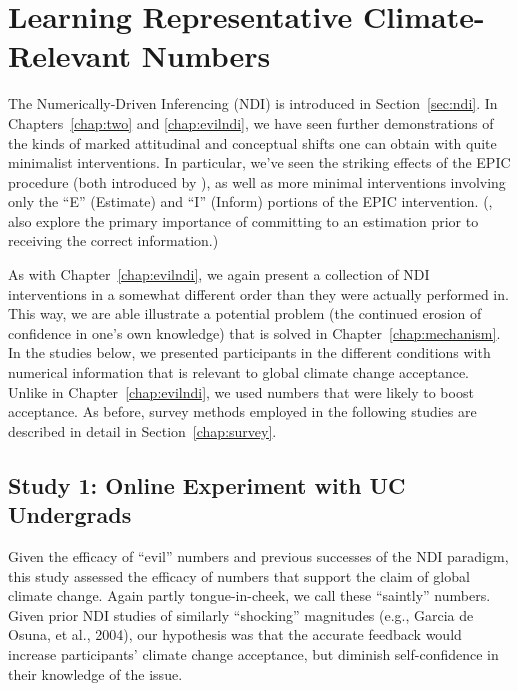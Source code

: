 \graphicspath{{pro-ndi/}}

\chapter{Learning Representative Climate-Relevant Numbers}
\label{chap:prondi}

The Numerically-Driven Inferencing (NDI) is introduced in Section~\ref{sec:ndi}.
In Chapters~\ref{chap:two} and \ref{chap:evilndi}, we have seen further
demonstrations of the kinds of marked attitudinal and conceptual shifts one can
obtain with quite minimalist interventions. In particular, we've seen the
striking effects of the EPIC procedure (both introduced by
\cite{ranney_numerically_2001_fixed}), as well as more minimal
interventions involving only the “E” (Estimate) and “I” (Inform) portions of the
EPIC intervention. (\cite{rinne_estimation_2006}, also explore the primary
importance of committing to an estimation prior to receiving the correct
information.)

As with Chapter~\ref{chap:evilndi}, we again present a collection of NDI
interventions in a somewhat different order than they were actually performed
in. This way, we are able illustrate a potential problem (the continued erosion
of confidence in one's own knowledge) that is solved in
Chapter~\ref{chap:mechanism}.  In the studies below, we presented participants
in the different conditions with numerical information that is relevant to
global climate change acceptance.  Unlike in Chapter~\ref{chap:evilndi}, we used
numbers that were likely to boost acceptance. As before, survey methods employed
in the following studies are described in detail in Section~\ref{chap:survey}.

\section{Study 1: Online Experiment with UC Undergrads}
\label{sec:pro-uc}

Given the efficacy of “evil” numbers and previous successes of the NDI paradigm,
this study assessed the efficacy of numbers that support the claim of global
climate change. Again partly tongue-in-cheek, we call these “saintly” numbers.
Given prior NDI studies of similarly “shocking” magnitudes (e.g., Garcia de
Osuna, et al., 2004), our hypothesis was that the accurate feedback would
increase participants’ climate change acceptance, but diminish self-confidence
in their knowledge of the issue.


